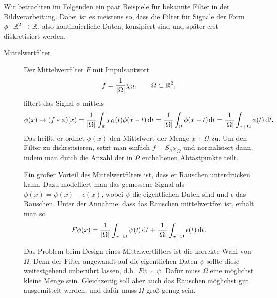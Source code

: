 \begin{example}
Wir betrachten im Folgenden ein paar Beispiele für bekannte Filter in der Bildverarbeitung. Dabei
ist es meistens so, dass die Filter für Signale der Form $ \phi \colon \mathbb{R}^{2} \rightarrow \mathbb{R} $, 
also kontinuierliche Daten, konzipiert sind und später erst diskretisiert werden.
\begin{description}
\item [Mittelwertfilter] Der Mittelwertfilter $ F $ mit Impulsantwort
  \[
    f = \frac{1}{|\Omega|}\chi_{\Omega}, \qquad \Omega \subset \mathbb{R}^{2},
  \]
  filtert das Signal $ \phi $ mittels
  \[
      \phi(x) \mapsto (f * \phi)(x)
    = \frac{1}{|\Omega|} \int_{\R} \chi_{\Omega}(t) \phi(x - t) \dif t
    = \frac{1}{|\Omega|} \int_{\Omega} \phi(x - t) \dif t
    = \frac{1}{|\Omega|} \int_{x + \Omega} \phi(t) \dif t.
  \]
  Das heißt, er ordnet $ \phi(x) $ den Mittelwert der Menge $ x + \Omega $ zu. Um den Filter zu
  diskretisieren, setzt man einfach $ f = S_{h}\chi_{\Omega} $ und normalisiert dann, indem man 
  durch die Anzahl der in $ \Omega $ enthaltenen Abtastpunkte teilt.
  
  Ein großer Vorteil des Mittelwertfilters ist, dass er Rauschen unterdrücken kann. Dazu modelliert
  man das gemessene Signal als $ \phi(x) = \psi(x) + \epsilon(x) $, wobei $ \psi $ die eigentlichen
  Daten sind und $ \epsilon $ das Rauschen. Unter der Annahme, dass das Rauschen mittelwertfrei ist,
  erhält man so
  \[
      F\phi (x)
    = \frac{1}{|\Omega|} \int_{x + \Omega} \psi(t) \dif t
        + \frac{1}{|\Omega|} \int_{x + \Omega} \epsilon(t) \dif t.
  \]
  
  Das Problem beim Design eines Mittelwertfilters ist die korrekte Wahl von $ \Omega $. Denn der 
  Filter angewandt auf die eigentlichen Daten $ \psi $ sollte diese weitestgehend unberührt lassen, 
  d.h.\ $ F\psi \sim \psi $. Dafür muss $ \Omega $ eine möglichst kleine Menge sein. Gleichzeitig 
  soll aber auch das Rauschen möglichst gut ausgemittelt werden, und dafür muss $ \Omega $ groß
  genug sein.
  

\end{description}
\end{example}

